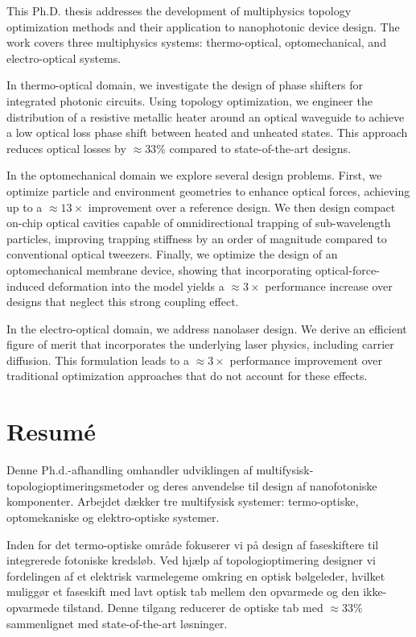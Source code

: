 This Ph.D. thesis addresses the development of multiphysics topology optimization methods and their application to nanophotonic device design. The work covers three multiphysics systems: thermo-optical, optomechanical, and electro-optical systems.

In thermo-optical domain, we investigate the design of phase shifters for integrated photonic circuits. Using topology optimization, we engineer the distribution of a resistive metallic heater around an optical waveguide to achieve a low optical loss phase shift between heated and unheated states. This approach reduces optical losses by $\approx 33\%$ compared to state-of-the-art designs.

In the optomechanical domain we explore several design problems. First, we optimize particle and environment geometries to enhance optical forces, achieving up to a $\approx 13 \times$ improvement over a reference design. We then design compact on-chip optical cavities capable of omnidirectional trapping of sub-wavelength particles, improving trapping stiffness by an order of magnitude compared to conventional optical tweezers. Finally, we optimize the design of an optomechanical membrane device, showing that incorporating optical-force-induced deformation into the model yields a $\approx 3 \times$ performance increase over designs that neglect this strong coupling effect.

In the electro-optical domain, we address nanolaser design. We derive an efficient figure of merit that incorporates the underlying laser physics, including carrier diffusion. This formulation leads to a $\approx 3\times$ performance improvement over traditional optimization approaches that do not account for these effects.

\chapter*{Resumé}
Denne Ph.d.-afhandling omhandler udviklingen af mul\-ti\-fy\-sisk-to\-po\-lo\-gi\-op\-ti\-merings\-me\-to\-der og deres anvendelse til design af nanofotoniske komponenter. Arbejdet dækker tre multifysisk systemer: termo-optiske, opto\-mekaniske og elektro-optiske systemer.

Inden for det termo-optiske område fokuserer vi på design af fase\-skiftere til integrerede fotoniske kredsløb. Ved hjælp af topologioptimering designer vi fordelingen af et elektrisk varmelegeme omkring en optisk bølgeleder, hvil\-ket muliggør et faseskift med lavt optisk tab mellem den opvarmede og den ikke-opvarmede tilstand. Denne tilgang reducerer de optiske tab med $\approx 33\%$ sammenlignet med state-of-the-art løsninger.

